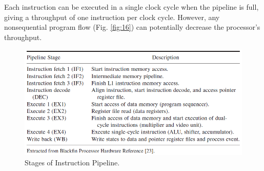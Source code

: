 Each instruction can be executed in a single clock cycle when the pipeline
is full, giving a throughput of one instruction per clock cycle. However, any
nonsequential program flow (Fig. \ref{fig:16}) can potentially decrease the
processor's throughput.

\begin{figure} [H]
	\centering
	\includegraphics[width=\linewidth]{graphics/15.png}
	\caption{Stages of Instruction Pipeline.}
	\label{fig:15}
\end{figure}